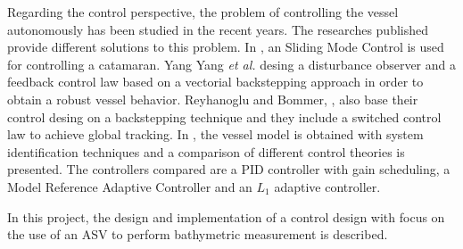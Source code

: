 Regarding the control perspective, the problem of controlling the vessel autonomously has been studied in the recent years. The researches published provide different solutions to this problem. In \cite{Prempraneerach}, an Sliding Mode Control is used for controlling a catamaran. Yang Yang \textit{et al.} \cite{YangYang} desing a disturbance observer and a feedback control law based on a vectorial backstepping approach in order to obtain a robust vessel behavior. Reyhanoglu and Bommer, \cite{Reyhanoglu}, also base their control desing on a backstepping technique and they include a switched control law to achieve global tracking. In \cite{Kragelund}, the vessel model is obtained with system identification techniques and a comparison of different control theories is presented. The controllers compared are a PID controller with gain scheduling, a Model Reference Adaptive Controller and an $\mathit{L}_1$ adaptive controller.

In this project, the design and implementation of a control design with focus on the use of an ASV to perform bathymetric measurement is described. 
